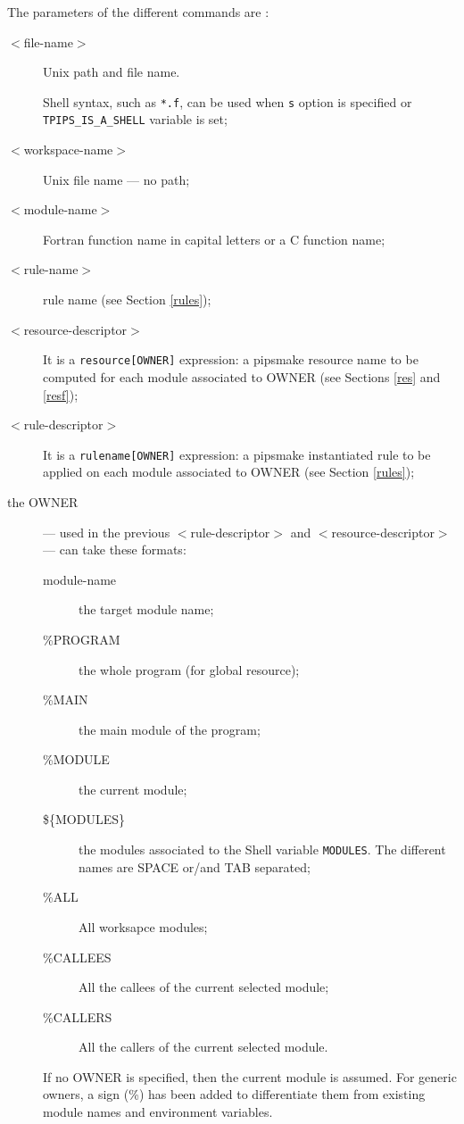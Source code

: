 \documentclass[a4paper,12pt]{article}
\begin{document}
The parameters of the different commands are :
\begin{description}
\item [$<$file-name$>$] Unix path and file name.
  \par Shell syntax, such as \verb+*.f+, can be used when \verb+s+ option
  is specified or \verb+TPIPS_IS_A_SHELL+ variable is set;

\item [$<$workspace-name$>$] Unix file name --- no path;

\item [$<$module-name$>$] Fortran function name in capital letters or a C
  function name;

\item [$<$rule-name$>$] rule name (see Section \ref{rules});

\item [$<$resource-descriptor$>$] It is a \verb+resource[OWNER]+
  expression: a pipsmake resource name to be computed for each module
  associated to OWNER (see Sections \ref{res} and \ref{resf});

\item [$<$rule-descriptor$>$] It is a \verb+rulename[OWNER]+ expression: a
  pipsmake instantiated rule to be applied on each module associated to
  OWNER (see Section \ref{rules});

\item [the OWNER] --- used in the previous $<$rule-descriptor$>$ and
$<$resource-descriptor$>$ --- can take these formats:
\begin{description}
\item [module-name] the target module name;
\item [\%PROGRAM] the whole program (for global resource);
\item [\%MAIN] the main module of the program;
\item [\%MODULE] the current module;
\item [\$\{MODULES\}] the modules associated to the Shell variable
  {\tt MODULES}. The different names are SPACE or/and TAB separated;
\item [\%ALL] All worksapce modules;
\item [\%CALLEES] All the callees of the current selected module;
\item [\%CALLERS] All the callers of the current selected module.
\end{description}
If no OWNER is specified, then the current  module is assumed. For
generic owners, a  sign (\%) has been added to differentiate them
from existing module names and environment variables.

\end{description}
\end{document}
